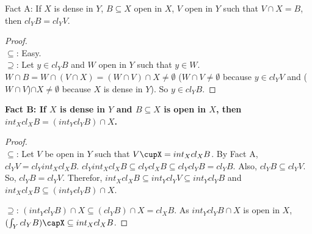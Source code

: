 \documentclass{amsart}
\author{shaun yi cheng}
\begin{document}
\bf{Fact A: If $X$ is dense in $Y$, $B \subseteq X$ open in $X$, $V$ open in $Y$ such that $V\cap X = B$, then $cl_Y B = cl_Y V$. 
\begin{proof}
\\
$\subseteq$: Easy. \\
$\supseteq$: Let $y \in cl_Y B$ and $W$ open in $Y$ such that $y\in W$. 
$W\cap B = W\cap (V\cap X) = (W\cap V)\cap X \neq \emptyset$ ($W\cap V \neq \emptyset$ because $y\in cl_Y V$ and ($W\cap V$)$\cap X \neq \emptyset$ because $X$ is dense in $Y$).
So $y\in cl_Y B$.
\end{proof}

\bf{Fact B: If $X$ is dense in $Y$ and $B \subseteq X $ is open in $X$, then $int_X cl_X B = (int_Y cl_Y B) \cap X$.  }

\begin{proof}
\\

$\subseteq $:
Let $V$ be open in $Y$ such that $V\cupX=int_X cl_X B$. By Fact A, $cl_Y V = cl_Y int_X cl_X B$. 
$cl_Y int_X cl_X B \subseteq cl_Y cl_X B \subseteq cl_Y cl_Y B = cl_Y B$. Also, $cl_Y B \subseteq cl_Y V$. So, 
$cl_Y B= cl_Y V$. Therefor, $int_X cl_X B \subseteq int_Y cl_Y V \subseteq int_Y cl_Y B$ and $int_X cl_X B \subseteq 
(int_Y cl_Y B)\cap X$.\\





	\begin{comment}
	Let $x \in int_X cl_X B$. Then there is an open set $U$ in $X$ such that $x \in U \subseteq cl_X B$.
	Let $V$ be open in $Y$ such that $V\cap X = U$. Let $E$ be open in $Y$ such that $E\cap X= B$.
	Pick any $y \in V$ and let $W$ be any open set in $Y$ such that $y \in W$. 
	Now, $W\cap B = W\cap (E\cap X) = (W\cap E) \cap X \neq \emptyset$ (Since $W\cap E$ is open in $Y$ and $X$ is dense 		in $Y$.)
	So $y \in cl_Y B$, and thus $V \subseteq cl_Y B$.
	Since $x \in V \subseteq cl_Y B$, we have $x\in int_Y cl_Y B$.
	\end{comment}



$\supseteq$: 
	$(int_Y cl_Y B) \cap X \subseteq (cl_Y B)\cap X = cl_X B$. As $int_Y cl_Y B \cap X$ is open in $X$, 
	$(\int_Y cl_Y B)\capX \subseteq int_X cl_X B$.
	



	\begin{comment}
	Let $y \in (int_Y clyB) \cap X$. Then $y \in W \subseteq cl_Y B$ for some $W$ open in $Y$. Let $V$ be open in $Y$ 	such that $B=V\cap X$. $W\cap X$ is open in $X$. For $x\in W\cap X$ and any $U$ open in $X$ such that $x\in U$, let 	$K$ be open in $Y$ so that $U=K\cap X$.
	Now we have $U\cap B= (K\cap X) \cap (V\cap X) = (K\cap V) \cap X \neq \emptyset$ (Since $K\cap V$ open in $Y$, and 	$X$ is dense in $Y$. Additionally, $K\cap V \neq \emptyset$ because $cl_Y B= cl_Y V$ by Fact A, so $W\subseteq cl_Y B= 	cl_Y V
	\Rightarrow x\in cl_Y V \Rightarrow U\cap V \neq \emptyset \Rightarrow K\cap V \neq \emptyset$) 
	Thus $W\cap X \subseteq cl_X B$. So $y \in W\cap X \subseteq cl_X B \Rightarrow y \in int_X cl_X B$.
	\end{comment}




\end{proof}}
\end{document}
